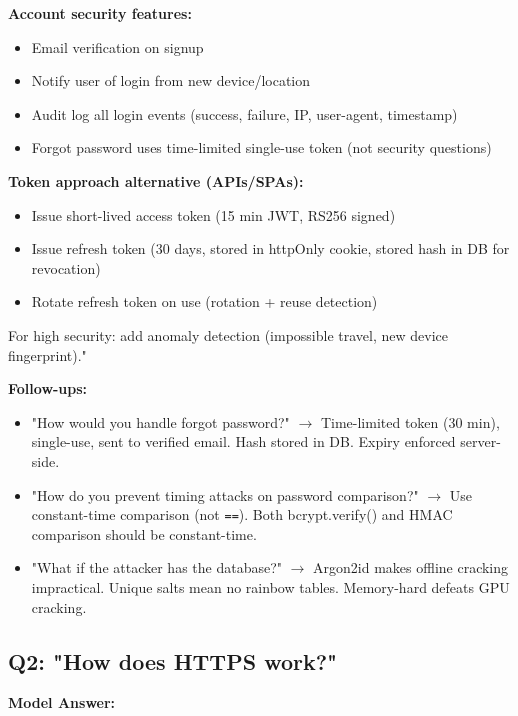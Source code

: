 \documentclass[11pt]{article}
\providecommand{\tightlist}{\setlength{\itemsep}{1pt}\setlength{\parskip}{0pt}}
\begin{document}
\textbf{Account security features:}

\begin{itemize}
\tightlist
\item
  Email verification on signup
\item
  Notify user of login from new device/location
\item
  Audit log all login events (success, failure, IP, user-agent, timestamp)
\item
  \textquotesingle Forgot password\textquotesingle{} uses time-limited single-use token (not security questions)
\end{itemize}

\textbf{Token approach alternative (APIs/SPAs):}

\begin{itemize}
\tightlist
\item
  Issue short-lived access token (15 min JWT, RS256 signed)
\item
  Issue refresh token (30 days, stored in httpOnly cookie, stored hash in DB for revocation)
\item
  Rotate refresh token on use (rotation + reuse detection)
\end{itemize}

For high security: add anomaly detection (impossible travel, new device fingerprint)."

\textbf{Follow-ups:}

\begin{itemize}
\tightlist
\item
  "How would you handle forgot password?" \(\rightarrow\) Time-limited token (30 min), single-use, sent to verified email. Hash stored in DB. Expiry enforced server-side.
\item
  "How do you prevent timing attacks on password comparison?" \(\rightarrow\) Use constant-time comparison (not \texttt{==}). Both bcrypt.verify() and HMAC comparison should be constant-time.
\item
  "What if the attacker has the database?" \(\rightarrow\) Argon2id makes offline cracking impractical. Unique salts mean no rainbow tables. Memory-hard defeats GPU cracking.
\end{itemize}

\subsection{Q2: "How does HTTPS work?"}\label{q2-how-does-https-work}

\textbf{Model Answer:}
\end{document}

